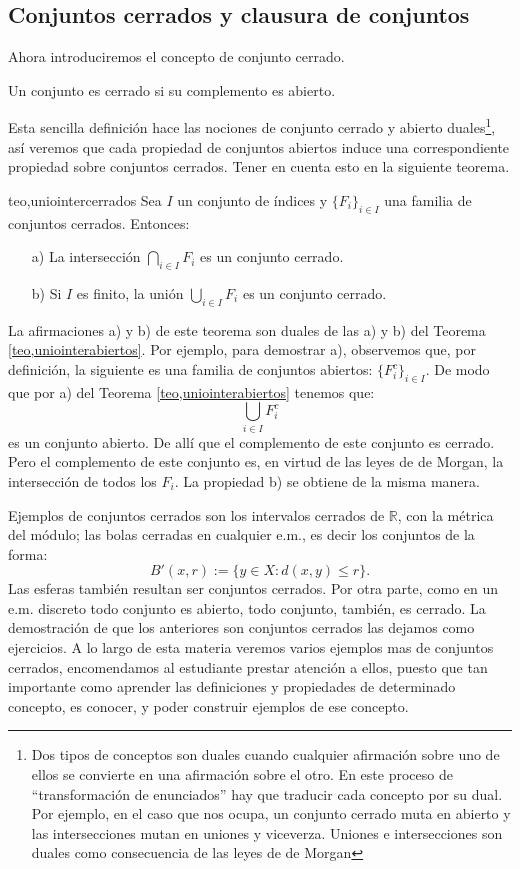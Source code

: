 \subsection{Conjuntos cerrados y clausura de
conjuntos}

Ahora introduciremos el concepto de conjunto cerrado.
\begin{definicion}{} Un conjunto es cerrado si su complemento es
abierto.
\end{definicion}

Esta sencilla definición hace las nociones de conjunto cerrado y
abierto duales\footnote{Dos tipos de conceptos son duales cuando
cualquier afirmación sobre uno de ellos se convierte en una
afirmación sobre el otro. En este proceso de ``transformación
de enunciados'' hay que traducir cada concepto por su dual. Por
ejemplo, en el caso que nos ocupa, un conjunto cerrado muta en
abierto y las intersecciones mutan en uniones y viceverza. Uniones
e intersecciones son duales como consecuencia de las leyes de de
Morgan}, así veremos que cada propiedad de conjuntos abiertos
induce una correspondiente propiedad sobre conjuntos cerrados.
Tener en cuenta esto en la siguiente teorema.

\begin{teorema}{teo,uniointercerrados} Sea $I$ un conjunto de índices y
$\{F_i\}_{i\in I}$ una familia de conjuntos cerrados. Entonces:
\begin{itemize}
\item[a)] La intersección $\bigcap_{i\in I}F_i$ es un conjunto cerrado.
\item[b)] Si $I$ es finito, la unión $\bigcup_{i\in
I}F_i$ es un conjunto cerrado.
\end{itemize}
\end{teorema}
\begin{demo} La afirmaciones a) y b) de este teorema son duales de
las a) y b) del Teorema \vref{teo,uniointerabiertos}. Por ejemplo,
para demostrar a), observemos que, por definición, la siguiente
es una familia de conjuntos abiertos: $\{F_i^c\}_{i\in I}$. De
modo que por a) del Teorema \vref{teo,uniointerabiertos} tenemos
que:
\[\bigcup\limits_{i\in I}F_i^c\]
es un conjunto abierto. De allí que el complemento de este
conjunto es cerrado. Pero el complemento de este conjunto es, en
virtud de las leyes de de Morgan, la intersección de todos los
$F_i$. La propiedad b) se obtiene de la misma manera.
\end{demo}

Ejemplos de conjuntos cerrados son los intervalos cerrados de
$\mathbb{R}$, con la métrica del módulo; las bolas cerradas en
cualquier e.m., es decir los conjuntos de la forma:
\[B'(x,r):=\{y\in X: d(x,y)\leq r\}.\]
Las esferas también resultan ser conjuntos cerrados. Por otra
parte, como en un e.m. discreto todo conjunto es abierto, todo
conjunto, también, es cerrado. La demostración de que los
anteriores son conjuntos cerrados las dejamos como ejercicios. A
lo largo de esta materia veremos varios ejemplos mas de conjuntos
cerrados, encomendamos al estudiante prestar atención a ellos,
puesto que tan importante como aprender las definiciones y
propiedades de determinado concepto, es conocer, y poder construir
ejemplos de ese concepto.

